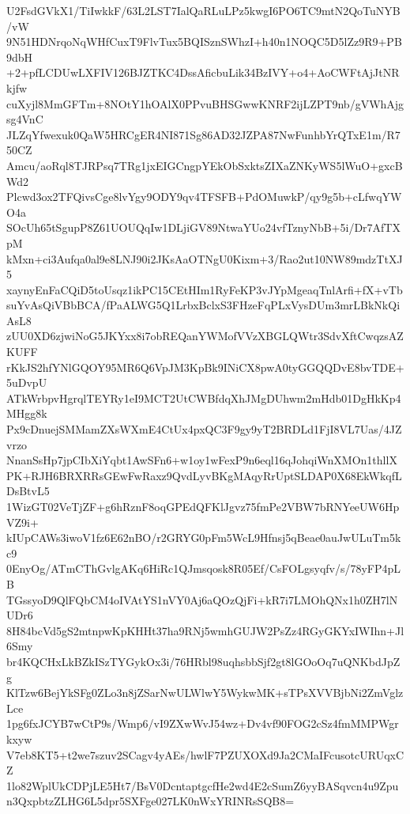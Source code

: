 U2FsdGVkX1/TiIwkkF/63L2LST7IalQaRLuLPz5kwgI6PO6TC9mtN2QoTuNYB/vW
9N51HDNrqoNqWHfCuxT9FlvTux5BQISznSWhzI+h40n1NOQC5D5lZz9R9+PB9dbH
+2+pfLCDUwLXFIV126BJZTKC4DssAficbuLik34BzIVY+o4+AoCWFtAjJtNRkjfw
cuXyjl8MmGFTm+8NOtY1hOAlX0PPvuBHSGwwKNRF2ijLZPT9nb/gVWhAjgsg4VnC
JLZqYfwexuk0QaW5HRCgER4NI871Sg86AD32JZPA87NwFunhbYrQTxE1m/R750CZ
Amcu/aoRql8TJRPsq7TRg1jxEIGCngpYEkObSxktsZIXaZNKyWS5lWuO+gxcBWd2
Plcwd3ox2TFQivsCge8lvYgy9ODY9qv4TFSFB+PdOMuwkP/qy9g5b+cLfwqYWO4a
SOcUh65tSgupP8Z61UOUQqIw1DLjiGV89NtwaYUo24vfTznyNbB+5i/Dr7AfTXpM
kMxn+ci3Aufqa0al9e8LNJ90i2JKsAaOTNgU0Kixm+3/Rao2ut10NW89mdzTtXJ5
xaynyEnFaCQiD5toUsqz1ikPC15CEtHIm1RyFeKP3vJYpMgeaqTnlArfi+fX+vTb
suYvAsQiVBbBCA/fPaALWG5Q1LrbxBclxS3FHzeFqPLxVysDUm3mrLBkNkQiAsL8
zUU0XD6zjwiNoG5JKYxx8i7obREQanYWMofVVzXBGLQWtr3SdvXftCwqzsAZKUFF
rKkJS2hfYNlGQOY95MR6Q6VpJM3KpBk9INiCX8pwA0tyGGQQDvE8bvTDE+5uDvpU
ATkWrbpvHgrqlTEYRy1eI9MCT2UtCWBfdqXhJMgDUhwm2mHdb01DgHkKp4MHgg8k
Px9cDnuejSMMamZXsWXmE4CtUx4pxQC3F9gy9yT2BRDLd1FjI8VL7Uas/4JZvrzo
NnanSsHp7jpCIbXiYqbt1AwSFn6+w1oy1wFexP9n6eql16qJohqiWnXMOn1thllX
PK+RJH6BRXRRsGEwFwRaxz9QvdLyvBKgMAqyRrUptSLDAP0X68EkWkqfLDsBtvL5
1WizGT02VeTjZF+g6hRznF8oqGPEdQFKlJgvz75fmPe2VBW7bRNYeeUW6HpVZ9i+
kIUpCAWs3iwoV1fz6E62nBO/r2GRYG0pFm5WcL9Hfnsj5qBeae0auJwULuTm5kc9
0EnyOg/ATmCThGvlgAKq6HiRc1QJmsqosk8R05Ef/CsFOLgsyqfv/s/78yFP4pLB
TGssyoD9QlFQbCM4oIVAtYS1nVY0Aj6aQOzQjFi+kR7i7LMOhQNx1h0ZH7lNUDr6
8H84bcVd5gS2mtnpwKpKHHt37ha9RNj5wmhGUJW2PsZz4RGyGKYxIWIhn+Jl6Smy
br4KQCHxLkBZkISzTYGykOx3i/76HRbl98uqhsbbSjf2gt8lGOoOq7uQNKbdJpZg
KlTzw6BejYkSFg0ZLo3n8jZSarNwULWlwY5WykwMK+sTPsXVVBjbNi2ZmVglzLce
1pg6fxJCYB7wCtP9s/Wmp6/vI9ZXwWvJ54wz+Dv4vf90FOG2cSz4fmMMPWgrkxyw
V7eb8KT5+t2we7szuv2SCagv4yAEs/hwlF7PZUXOXd9Ja2CMaIFcusotcURUqxCZ
1lo82WplUkCDPjLE5Ht7/BsV0DcntaptgcfHe2wd4E2cSumZ6yyBASqvcn4u9Zpu
n3QxpbtzZLHG6L5dpr5SXFge027LK0nWxYRINRsSQB8=
